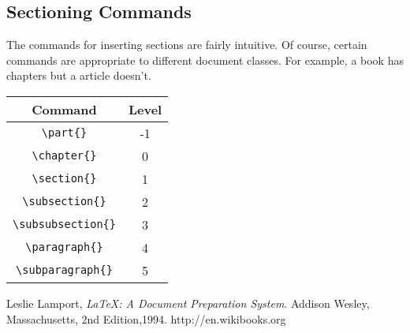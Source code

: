 \documentclass{article}
\begin{document}
\subsection{Sectioning Commands}
\label{sec:sectioning-commands}

The commands for inserting sections are fairly intuitive.  Of course,
certain commands are appropriate to different document classes.
For example, a book has chapters but a article doesn't.
\begin{center}
  \begin{tabular}{|c|c|}
    \hline
    Command & Level \\ \hline
    \verb|\part{}| & -1 \\
    \verb|\chapter{}| & 0 \\
    \verb|\section{}| & 1 \\
    \verb|\subsection{}| & 2 \\
    \verb|\subsubsection{}| & 3 \\
    \verb|\paragraph{}| & 4 \\
    \verb|\subparagraph{}| & 5 \\
    \hline
  \end{tabular}
\end{center}

\begin{thebibliography}{99}
  Leslie Lamport,
  \emph{\LaTeX: A Document Preparation System}.
  Addison Wesley, Massachusetts,
  2nd Edition,1994.
  http://en.wikibooks.org
\end{thebibliography}
\end{document}
